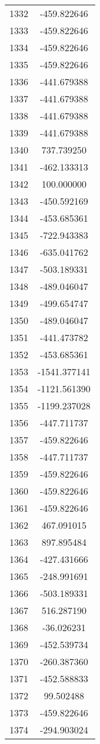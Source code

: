 \documentclass[12pt]{article}
\begin{document}
\begin{longtable}{@{}cc@{}}
1332 & -459.822646 \\
1333 & -459.822646 \\
1334 & -459.822646 \\
1335 & -459.822646 \\
1336 & -441.679388 \\
1337 & -441.679388 \\
1338 & -441.679388 \\
1339 & -441.679388 \\
1340 & 737.739250 \\
1341 & -462.133313 \\
1342 & 100.000000 \\
1343 & -450.592169 \\
1344 & -453.685361 \\
1345 & -722.943383 \\
1346 & -635.041762 \\
1347 & -503.189331 \\
1348 & -489.046047 \\
1349 & -499.654747 \\
1350 & -489.046047 \\
1351 & -441.473782 \\
1352 & -453.685361 \\
1353 & -1541.377141 \\
1354 & -1121.561390 \\
1355 & -1199.237028 \\
1356 & -447.711737 \\
1357 & -459.822646 \\
1358 & -447.711737 \\
1359 & -459.822646 \\
1360 & -459.822646 \\
1361 & -459.822646 \\
1362 & 467.091015 \\
1363 & 897.895484 \\
1364 & -427.431666 \\
1365 & -248.991691 \\
1366 & -503.189331 \\
1367 & 516.287190 \\
1368 & -36.026231 \\
1369 & -452.539734 \\
1370 & -260.387360 \\
1371 & -452.588833 \\
1372 & 99.502488 \\
1373 & -459.822646 \\
1374 & -294.903024 \\

\end{longtable}
\end{document}
